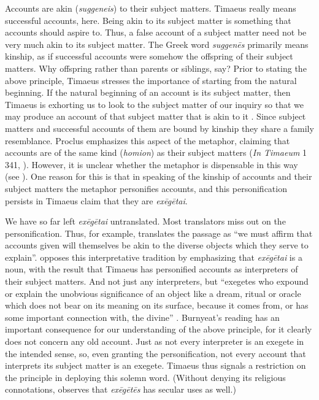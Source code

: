 Accounts are akin (\emph{suggeneis}) to their subject matters. Timaeus really means successful accounts, here. Being akin to its subject matter is something that accounts should aspire to. Thus, a false account of a subject matter need not be very much akin to its subject matter. The Greek word \emph{suggenēs} primarily means kinship, as if successful accounts were somehow the offspring of their subject matters. Why offspring rather than parents or siblings, say? Prior to stating the above principle, Timaeus stresses the importance of starting from the natural beginning. If the natural beginning of an account is its subject matter, then Timaeus is exhorting us to look to the subject matter of our inquiry so that we may produce an account of that subject matter that is akin to it \citep[120--1]{Bryan:2012bt}. Since subject matters and successful accounts of them are bound by kinship they share a family resemblance. Proclus emphasizes this aspect of the metaphor, claiming that accounts are of the same kind (\emph{homion}) as their subject matters (\emph{In Timaeum} 1 341, \citealt{Diehl:1903re}). However, it is unclear whether the metaphor is dispensable in this way (see \citealt[122]{Bryan:2012bt}). One reason for this is that in speaking of the kinship of accounts and their subject matters the metaphor personifies accounts, and this personification persists in Timaeus claim that they are \emph{exēgētai}.

We have so far left \emph{exēgētai} untranslated. Most translators miss out on the personification. Thus, for example, \citet[53]{Bury:1929jb} translates the passage as ``we must affirm that accounts given will themselves be akin to the diverse objects which they serve to explain''. \citet[]{Burnyeat:2005it} opposes this interpretative tradition by emphasizing that \emph{exēgētai} is a noun, with the result that Timaeus has personified accounts as interpreters of their subject matters. And not just any interpreters, but ``exegetes who expound or explain the unobvious significance of an object like a dream, ritual or oracle which does not bear on its meaning on its surface, because it comes from, or has some important connection with, the divine'' \citep[149]{Burnyeat:2005it}. Burnyeat's reading has an important consequence for our understanding of the above principle, for it clearly does not concern any old account. Just as not every interpreter is an exegete in the intended sense, so, even granting the personification, not every account that interprets its subject matter is an exegete. Timaeus thus signals a restriction on the principle in deploying this solemn word. (Without denying its religious connotations, \citealt[216--7]{Betegh:2010aa} observes that \emph{exēgētēs} has secular uses as well.) 

